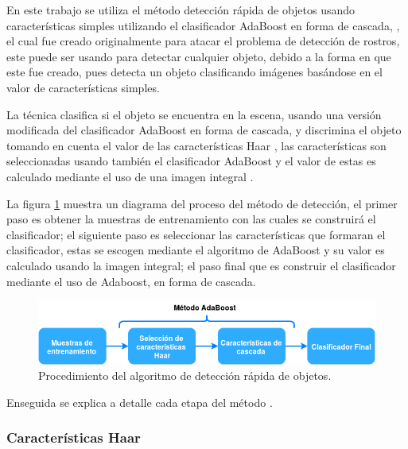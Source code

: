 En este trabajo se utiliza el método detección rápida de objetos usando características simples utilizando el clasificador AdaBoost en forma de cascada, \citep{Viola2001}, el cual fue creado originalmente para atacar el problema de detección de rostros, este puede ser usando para detectar cualquier objeto, debido a la forma en que este fue creado, pues detecta un objeto clasificando imágenes basándose en el valor de características simples.

La técnica clasifica si el objeto se encuentra en la escena, usando una versión modificada del clasificador AdaBoost \citep{Freund1995} en forma de cascada, y discrimina el objeto tomando en cuenta el valor de las características Haar \citep{Viola2001}, las características son seleccionadas usando también el clasificador AdaBoost y el valor de estas es calculado mediante el uso de una imagen integral \citep{Viola2001}. 

La figura \ref{fig:ViolaJonesDiagram} muestra un diagrama del proceso del método de detección, el primer paso es obtener la muestras de entrenamiento con las cuales se construirá el clasificador; el siguiente paso es seleccionar las características que formaran el clasificador, estas se escogen mediante el algoritmo de AdaBoost y su valor es calculado usando la imagen integral; el paso final que es construir el clasificador mediante el uso de Adaboost,  en forma de cascada.

\begin{figure}[h!]
\begin{center}
\includegraphics[scale=.6]{./Figures/ViolaJonesDiagram.png}
\end{center}
\caption{Procedimiento del algoritmo de detección rápida de objetos.}
\label{fig:ViolaJonesDiagram}
\end{figure}

Enseguida se explica a detalle cada etapa del método \citep{Viola2001}. 

\subsubsection{Características Haar}\label{sssec:CaracteristicasHaar}  

